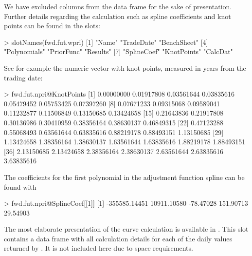 \vspace{0.5cm}

\noindent We have excluded columns from the data frame for the sake of presentation. Further details regarding the calculation such as spline coefficients and knot points can be found in the slots:

\begin{example*}
> slotNames(fwd.fut.wpri)
[1] "Name"        "TradeDate"   "BenchSheet" 
[4] "Polynomials" "PriorFunc"   "Results"    
[7] "SplineCoef"  "KnotPoints"  "CalcDat"  
\end{example*}

\newpage

\noindent See for example the numeric vector with knot points, measured in years from the trading date:

\begin{example*}
> fwd.fut.npri@KnotPoints
 [1] 0.00000000 0.01917808 0.03561644 0.03835616 0.05479452 0.05753425 0.07397260
 [8] 0.07671233 0.09315068 0.09589041 0.11232877 0.11506849 0.13150685 0.13424658
[15] 0.21643836 0.21917808 0.30136986 0.30410959 0.38356164 0.38630137 0.46849315
[22] 0.47123288 0.55068493 0.63561644 0.63835616 0.88219178 0.88493151 1.13150685
[29] 1.13424658 1.38356164 1.38630137 1.63561644 1.63835616 1.88219178 1.88493151
[36] 2.13150685 2.13424658 2.38356164 2.38630137 2.63561644 2.63835616 3.63835616
\end{example*} 

\noindent The coefficients for the first polynomial in the adjustment function spline can be found with 

\begin{example*}
> fwd.fut.npri@SplineCoef[[1]]
[1] -355585.14451   10911.10580     -78.47028     151.90713      29.54903
\end{example*} 

\noindent The most elaborate presentation of the curve calculation is available in . This slot contains a data frame with all calculation details for each of the daily values returned by . It is not included here due to space requirements.

